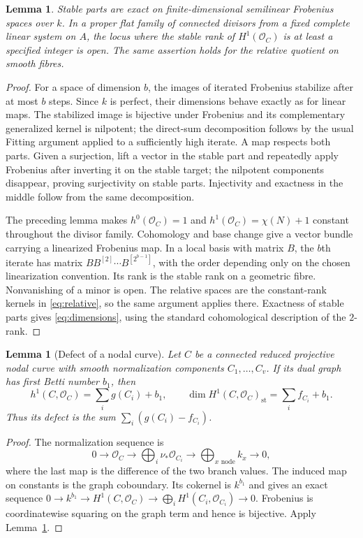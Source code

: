 \documentclass[11pt]{article}
\newtheorem{lemma}[theorem]{Lemma}
\theoremstyle{definition}\newtheorem{definition}[theorem]{Definition}
\theoremstyle{remark}\newtheorem{remark}[theorem]{Remark}
\newcommand{\OO}{\mathcal O}
\begin{document}
\begin{lemma}\label{lem:stable}
Stable parts are exact on finite-dimensional semilinear Frobenius spaces over $k$. In a proper flat family of connected divisors from a fixed complete linear system on $A$, the locus where the stable rank of $H^1(\OO_C)$ is at least a specified integer is open. The same assertion holds for the relative quotient on smooth fibres.
\end{lemma}
\begin{proof}
For a space of dimension $b$, the images of iterated Frobenius stabilize after at most $b$ steps. Since $k$ is perfect, their dimensions behave exactly as for linear maps. The stabilized image is bijective under Frobenius and its complementary generalized kernel is nilpotent; the direct-sum decomposition follows by the usual Fitting argument applied to a sufficiently high iterate. A map respects both parts. Given a surjection, lift a vector in the stable part and repeatedly apply Frobenius after inverting it on the stable target; the nilpotent components disappear, proving surjectivity on stable parts. Injectivity and exactness in the middle follow from the same decomposition.

The preceding lemma makes $h^0(\OO_C)=1$ and $h^1(\OO_C)=\chi(N)+1$ constant throughout the divisor family. Cohomology and base change give a vector bundle carrying a linearized Frobenius map. In a local basis with matrix $B$, the $b$th iterate has matrix $B B^{[2]}\cdots B^{[2^{b-1}]}$, with the order depending only on the chosen linearization convention. Its rank is the stable rank on a geometric fibre. Nonvanishing of a minor is open. The relative spaces are the constant-rank kernels in \eqref{eq:relative}, so the same argument applies there. Exactness of stable parts gives \eqref{eq:dimensions}, using the standard cohomological description of the $2$-rank.
\end{proof}

\begin{lemma}[Defect of a nodal curve]\label{lem:nodal}
Let $C$ be a connected reduced projective nodal curve with smooth normalization components $C_1,\ldots,C_v$. If its dual graph has first Betti number $b_1$, then
\[
 h^1(C,\OO_C)=\sum_i g(C_i)+b_1,\qquad
 \dim H^1(C,\OO_C)_{\mathrm{st}}=\sum_i f_{C_i}+b_1.
\]
Thus its defect is the sum $\sum_i(g(C_i)-f_{C_i})$.
\end{lemma}
\begin{proof}
The normalization sequence is
\[
 0\to\OO_C\to\bigoplus_i\nu_*\OO_{C_i}\to\bigoplus_{x\text{ node}}k_x\to0,
\]
where the last map is the difference of the two branch values. The induced map on constants is the graph coboundary. Its cokernel is $k^{b_1}$ and gives an exact sequence
$0\to k^{b_1}\to H^1(C,\OO_C)\to\bigoplus_iH^1(C_i,\OO_{C_i})\to0$.
Frobenius is coordinatewise squaring on the graph term and hence is bijective. Apply Lemma~\ref{lem:stable}.
\end{proof}
\end{document}
